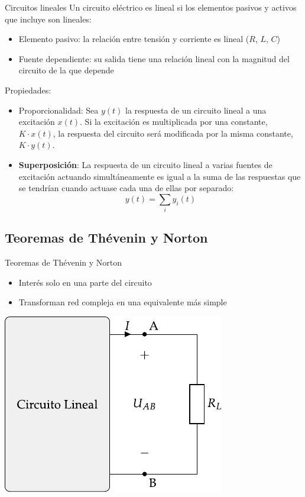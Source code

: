 \documentclass[aspectratio=169, xcolor={usenames,svgnames,dvipsnames}]{beamer}
\begin{document}
\begin{frame}{Circuitos lineales}
Un circuito eléctrico es \alert{lineal} si los elementos pasivos y activos que incluye son lineales:
	\begin{itemize}
	    \item \alert{Elemento pasivo}: la relación entre tensión y corriente es lineal ($R$, $L$, $C$)
        \item \alert{Fuente dependiente}: su salida tiene una relación lineal con la magnitud del circuito de la que depende
	\end{itemize}
Propiedades:
\begin{itemize}
    \item \alert{Proporcionalidad}: Sea $y(t)$ la respuesta de un circuito lineal a una excitación $x(t)$. Si la excitación es multiplicada por una constante, $K\cdot x(t)$, la respuesta del circuito será modificada por la misma constante, $K \cdot y(t)$.
    \item \textbf{Superposición}: La respuesta de un circuito lineal a varias fuentes de excitación actuando simultáneamente es igual a la suma de las respuestas que se tendrían cuando actuase cada una de ellas por separado:
    \begin{equation*}
        y(t)=\sum_i y_i(t)
    \end{equation*}
\end{itemize}
    
\end{frame}


\subsection{Teoremas de Thévenin y Norton}

\begin{frame}{Teoremas de Thévenin y Norton}

\begin{itemize}
    \item Interés solo en \alert{una parte} del circuito
    \item Transforman red compleja en una equivalente \alert{más simple}
\end{itemize}

\begin{center}
\includegraphics[width=.4\linewidth]{../figs/thevenin_continua_red.pdf}
\end{center}
\end{frame}
\end{document}
